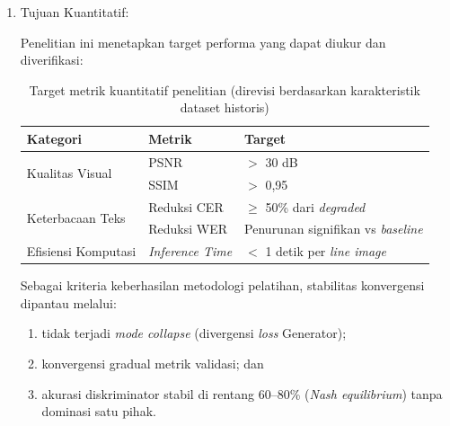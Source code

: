 \documentclass[12pt,a4paper]{article}
\begin{document}
\begin{enumerate}[label=\arabic*., leftmargin=*, labelindent=0pt, itemsep=1ex, topsep=0pt]

\item Tujuan Kuantitatif:

Penelitian ini menetapkan target performa yang dapat diukur dan diverifikasi:

\begin{table}[H]
    \centering
    \caption[Target Metrik Kuantitatif Penelitian]{Target metrik kuantitatif penelitian (direvisi berdasarkan karakteristik dataset historis)}
    \label{tab:target-metrik}
    \normalsize
    \begin{tabular}{|l|l|l|}
        \hline
        Kategori                          & Metrik         & Target                                           \\ \hline
        \multirow{2}{*}{Kualitas Visual}  & PSNR           & $>$ 30 dB \footnotemark[1]                       \\ \cline{2-3}
                                          & SSIM           & $>$ 0,95                                         \\ \hline
        \multirow{2}{*}{Keterbacaan Teks} & Reduksi CER    & $\geq$ 50\% dari \textit{degraded} \footnotemark[2] \\ \cline{2-3}
                                          & Reduksi WER    & Penurunan signifikan vs \textit{baseline}       \\ \hline
        Efisiensi Komputasi               & \textit{Inference Time} & $<$ 1 detik per \textit{line image}  \\ \hline
    \end{tabular}
\end{table}


Sebagai kriteria keberhasilan metodologi pelatihan, stabilitas konvergensi dipantau melalui:
\begin{enumerate}[label=(\alph*), leftmargin=*, nosep]
    \item tidak terjadi \textit{mode collapse} (divergensi \textit{loss} Generator);
    \item konvergensi gradual metrik validasi; dan
    \item akurasi diskriminator stabil di rentang 60--80\% (\textit{Nash equilibrium}) tanpa dominasi satu pihak.
\end{enumerate}


\end{enumerate}
\end{document}
